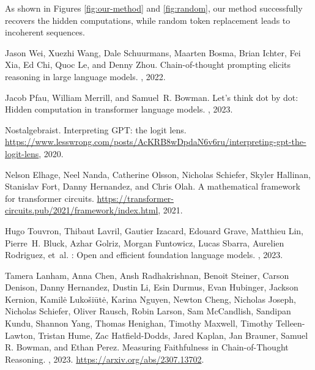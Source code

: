 \documentclass{article}
\begin{document}
As shown in Figures \ref{fig:our-method} and \ref{fig:random}, our method successfully recovers the hidden computations, while random token replacement leads to incoherent sequences.

\newpage
\begin{thebibliography}{12}

Jason Wei, Xuezhi Wang, Dale Schuurmans, Maarten Bosma, Brian Ichter, Fei Xia,
  Ed Chi, Quoc Le, and Denny Zhou.
\newblock Chain-of-thought prompting elicits reasoning in large language
  models.
, 2022.

Jacob Pfau, William Merrill, and Samuel~R. Bowman.
\newblock Let's think dot by dot: Hidden computation in transformer language
  models.
, 2023.

Nostalgebraist.
\newblock Interpreting {GPT}: the logit lens.
\newblock
  \url{https://www.lesswrong.com/posts/AcKRB8wDpdaN6v6ru/interpreting-gpt-the-logit-lens},
  2020.

Nelson Elhage, Neel Nanda, Catherine Olsson, Nicholas Schiefer, Skyler Hallinan,
  Stanislav Fort, Danny Hernandez, and Chris Olah.
\newblock A mathematical framework for transformer circuits.
\newblock
  \url{https://transformer-circuits.pub/2021/framework/index.html}, 2021.


Hugo Touvron, Thibaut Lavril, Gautier Izacard, Edouard Grave, Matthieu
  Lin, Pierre~H. Bluck, Azhar Golriz, Morgan Funtowicz, Lucas
  Sbarra, Aurelien Rodriguez, et~al.
: Open and efficient foundation language models.
, 2023.

Tamera Lanham, Anna Chen, Ansh Radhakrishnan, Benoit Steiner, Carson Denison, Danny Hernandez, Dustin Li, Esin Durmus, Evan Hubinger, Jackson Kernion, Kamilė Lukošiūtė, Karina Nguyen, Newton Cheng, Nicholas Joseph, Nicholas Schiefer, Oliver Rausch, Robin Larson, Sam McCandlish, Sandipan Kundu, Shannon Yang, Thomas Henighan, Timothy Maxwell, Timothy Telleen-Lawton, Tristan Hume, Zac Hatfield-Dodds, Jared Kaplan, Jan Brauner, Samuel R. Bowman, and Ethan Perez.
\newblock Measuring Faithfulness in Chain-of-Thought Reasoning.
, 2023.
\newblock \url{https://arxiv.org/abs/2307.13702}.


\end{thebibliography}
\end{document}
